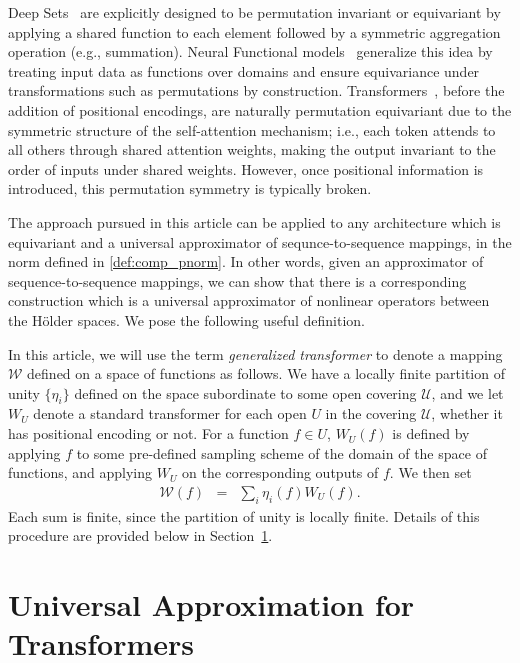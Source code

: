 \documentclass[a4paper,12pt,reqno]{amsart}
\theoremstyle{definition}
\theoremstyle{remark}
\begin{document}
Deep Sets~\cite{zaheer2017deep} are explicitly designed to be permutation invariant or equivariant by applying a shared function to each element followed by a symmetric aggregation operation (e.g., summation). Neural Functional models~\cite{zhou2024universal} generalize this idea by treating input data as functions over domains and ensure equivariance under transformations such as permutations by construction. Transformers~\cite{vaswani2017attention}, before the addition of positional encodings, are naturally permutation equivariant due to the symmetric structure of the self-attention mechanism; i.e., each token attends to all others through shared attention weights, making the output invariant to the order of inputs under shared weights. However, once positional information is introduced, this permutation symmetry is typically broken.

The approach pursued in this article can be applied to any architecture which is equivariant and a universal approximator of sequnce-to-sequence mappings, in the norm defined in \eqref{def:comp_pnorm}. In other words, given an approximator of sequence-to-sequence mappings, we can show that there is a corresponding construction which is a universal approximator of nonlinear operators between the H\"older spaces. We pose the following useful definition. 

In this article, we will use the term {\it generalized transformer} to denote a mapping $\mathcal W$ defined on a space of functions as follows. We have a locally finite partition of unity $\{\eta_i\}$ defined on the space subordinate to some open covering $\mathcal U$, and we let $W_U$ denote a standard transformer for each open $U$ in the covering $\mathcal U$, whether it has positional encoding or not. For a function $f\in U$, $W_U(f)$ is defined by applying $f$ to some pre-defined sampling scheme of the domain of the space of functions, and applying $W_U$ on the corresponding outputs of $f$. We then set 
\begin{eqnarray*}
    \mathcal W(f) &=& \sum_i\eta_i(f)W_U(f). 
\end{eqnarray*}
Each sum is finite, since the partition of unity is locally finite. Details of this procedure are provided below in Section~\ref{sec:transformer}. 


\section{Universal Approximation for Transformers}\label{sec:transformer}
\end{document}
